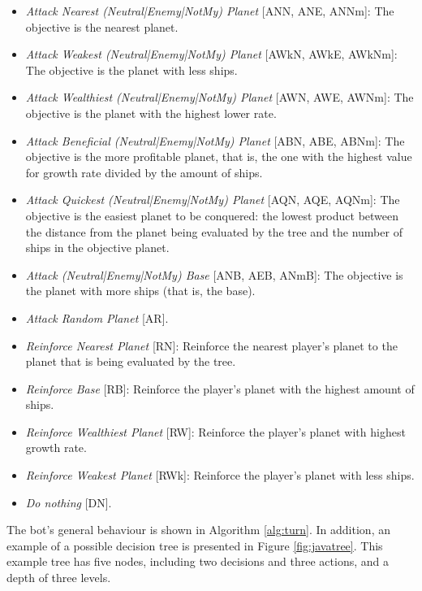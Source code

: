 \documentclass[conference]{IEEEtran}
\begin{document}
\begin{itemize}
\item {\em Attack Nearest (Neutral|Enemy|NotMy) Planet} [ANN, ANE, ANNm]: The objective is the nearest planet.
\item {\em Attack Weakest (Neutral|Enemy|NotMy) Planet} [AWkN, AWkE, AWkNm]: The objective is the planet with less ships.
\item {\em Attack Wealthiest (Neutral|Enemy|NotMy) Planet} [AWN, AWE, AWNm]: The objective is the planet with the highest lower rate.
\item {\em Attack Beneficial (Neutral|Enemy|NotMy) Planet} [ABN, ABE, ABNm]: The objective is the  more profitable planet, that is, the one with the highest value for growth rate divided by the amount of ships.
\item {\em Attack Quickest (Neutral|Enemy|NotMy) Planet} [AQN, AQE, AQNm]: The objective is the easiest planet to be conquered: the lowest product between the distance from the planet being evaluated by the tree and the number of ships in the objective planet.
\item {\em Attack (Neutral|Enemy|NotMy) Base} [ANB, AEB, ANmB]: The objective is the planet with more ships (that is, the base).
\item {\em Attack Random Planet} [AR].
\item {\em Reinforce Nearest Planet} [RN]: Reinforce the nearest player's planet to the planet that is being evaluated by the tree.
\item {\em Reinforce Base} [RB]: Reinforce the player's planet with the highest amount of ships.
\item {\em Reinforce Wealthiest Planet} [RW]: Reinforce the player's planet with highest growth rate.
\item {\em Reinforce Weakest Planet} [RWk]: Reinforce the player's planet with less ships.
\item {\em Do nothing} [DN].

\end{itemize}

The bot's general behaviour is shown in Algorithm \ref{alg:turn}.
In addition, an example of a possible decision tree is presented in Figure \ref{fig:javatree}. This example tree has five nodes, including two decisions and three actions, and a depth of three levels.
\end{document}
